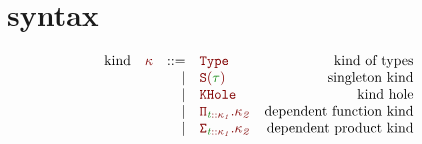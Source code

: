 \documentclass[12pt,fleqn]{article}
\newcommand{\red}[1]{\textcolor{red}{#1}}
\newcommand{\green}[1]{\textcolor{green}{#1}}
\newcommand{\redtt}[1]{\red{\mathtt{#1}}}
\newcommand{\redit}[1]{\red{\mathit{#1}}}
\newcommand{\greenit}[1]{\green{\mathit{#1}}}
\newcommand{\knd}[1][]{\redit{\kappa#1}}
\newcommand{\typ}[1][]{\greenit{\tau#1}}
\newcommand{\typvar}[1][]{\greenit{t#1}}
\newcommand{\Type}{\redtt{Type}}
\newcommand{\SKind}[1]{\redtt{S(#1)}}
\newcommand{\KHole}{\redtt{KHole}}
\newcommand{\DepFunKind}[2]{\redtt{\Pi_{#1}.{#2}}}
\newcommand{\DepProdKind}[2]{\redtt{\Sigma_{#1}.{#2}}}
\begin{document}
\section{syntax}
\[\begin{array}{rcrlr}
    \textrm{kind} & \knd & ::=
                  & \Type & \textrm{kind of types} \\
                  && \vert & \SKind{\typ} & \textrm{singleton kind} \\
                  && \vert & \KHole & \textrm{kind hole} \\
                  && \vert & \DepFunKind{\typvar::\knd[_1]}{\knd[_2]} & \textrm{dependent function kind} \\
                  && \vert & \DepProdKind{\typvar::\knd[_1]}{\knd[_2]} & \textrm{dependent product kind} \\
\end{array}\]
\end{document}
